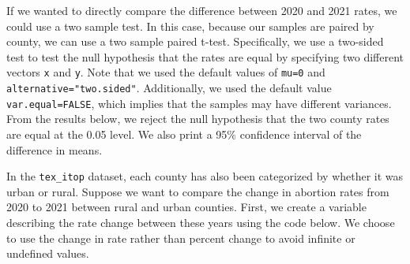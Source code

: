 \documentclass[
  letterpaper,
]{krantz}
\makeatletter
\newenvironment{Shaded}{\begin{snugshade}}{\end{snugshade}}
\newcommand{\AttributeTok}[1]{\textcolor[rgb]{0.40,0.45,0.13}{#1}}
\newcommand{\CommentTok}[1]{\textcolor[rgb]{0.37,0.37,0.37}{#1}}
\newcommand{\FunctionTok}[1]{\textcolor[rgb]{0.28,0.35,0.67}{#1}}
\newcommand{\NormalTok}[1]{\textcolor[rgb]{0.00,0.23,0.31}{#1}}
\newcommand{\OtherTok}[1]{\textcolor[rgb]{0.00,0.23,0.31}{#1}}
\newcommand{\SpecialCharTok}[1]{\textcolor[rgb]{0.37,0.37,0.37}{#1}}
\newenvironment{kframe}{%
\medskip{}
\setlength{\fboxsep}{.8em}
 \def\at@end@of@kframe{}%
 \ifinner\ifhmode%
  \def\at@end@of@kframe{\end{minipage}}%
  \begin{minipage}{\columnwidth}%
 \fi\fi%
 \def\FrameCommand##1{\hskip\@totalleftmargin \hskip-\fboxsep
 \colorbox{shadecolor}{##1}\hskip-\fboxsep
     \hskip-\linewidth \hskip-\@totalleftmargin \hskip\columnwidth}%
 \MakeFramed {\advance\hsize-\width
   \@totalleftmargin\z@ \linewidth\hsize
   \@setminipage}}%
 {\par\unskip\endMakeFramed%
 \at@end@of@kframe}
\renewenvironment{Shaded}{\begin{kframe}}{\end{kframe}}
\makeatother
\begin{document}
If we wanted to directly compare the difference between 2020 and 2021
rates, we could use a two sample test. In this case, because our samples
are paired by county, we can use a two sample paired t-test.
Specifically, we use a two-sided test to test the null hypothesis that
the rates are equal by specifying two different vectors \texttt{x} and
\texttt{y}. Note that we used the default values of \texttt{mu=0} and
\texttt{alternative="two.sided"}. Additionally, we used the default
value \texttt{var.equal=FALSE}, which implies that the samples may have
different variances. From the results below, we reject the null
hypothesis that the two county rates are equal at the 0.05 level. We
also print a 95\% confidence interval of the difference in means.

\begin{Shaded}
\end{Shaded}

In the \texttt{tex\_itop} dataset, each county has also been categorized
by whether it was urban or rural. Suppose we want to compare the change
in abortion rates from 2020 to 2021 between rural and urban counties.
First, we create a variable describing the rate change between these
years using the code below. We choose to use the change in rate rather
than percent change to avoid infinite or undefined values.
\end{document}

